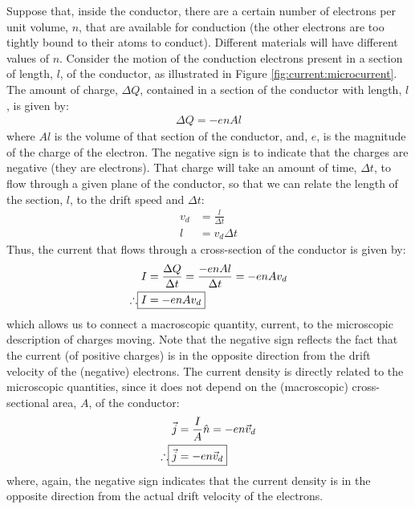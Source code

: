 Suppose that, inside the conductor, there are a certain number of electrons per unit volume, $n$, that are available for conduction (the other electrons are too tightly bound to their atoms to conduct). Different materials will have different values of $n$. Consider the motion of the conduction electrons present in a section of length, $l$, of the conductor, as illustrated in Figure \ref{fig:current:microcurrent}.
The amount of charge, $\Delta Q$, contained in a section of the conductor with length, $l$, is given by:
\begin{align*}
\Delta Q= -e n Al
\end{align*}
where $Al$ is the volume of that section of the conductor, and, $e$, is the magnitude of the charge of the electron. The negative sign is to indicate that the charges are negative (they are electrons). That charge will take an amount of time, $\Delta t$, to flow through a given plane of the conductor, so that we can relate the length of the section, $l$, to the drift speed and $\Delta t$:
\begin{align*}
v_d &= \frac{l}{\Delta t}\\
l&=v_d\Delta t
\end{align*}
Thus, the current that flows through a cross-section of the conductor is given by:
\begin{align*}
I&=\frac{\Delta Q}{\Delta t}=\frac{-e n Al}{\Delta t}=-enAv_d\\
\therefore\Aboxed{I&=-enAv_d}
\end{align*}
which allows us to connect a macroscopic quantity, current, to the microscopic description of charges moving. Note that the negative sign reflects the fact that the current (of positive charges) is in the opposite direction from the drift velocity of the (negative) electrons. The current density is directly related to the microscopic quantities, since it does not depend on the (macroscopic) cross-sectional area, $A$, of the conductor:
\begin{align*}
\vec j&=\frac{I}{A}\hat n = -en\vec v_d\\
\therefore \Aboxed{\vec j &= -en\vec v_d}
\end{align*}
where, again, the negative sign indicates that the current density is in the opposite direction from the actual drift velocity of the electrons.

